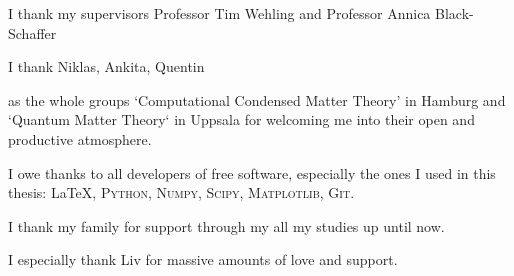 \documentclass[../main.tex]{subfiles}
\begin{document}
I thank my supervisors Professor Tim Wehling and Professor Annica Black-Schaffer

I thank Niklas, Ankita, Quentin

as the whole groups `Computational Condensed Matter Theory' in Hamburg and `Quantum Matter Theory` in Uppsala for welcoming me into their open and  productive atmosphere.

I owe thanks to all developers of free software, especially the ones I used in this thesis: \LaTeX, \textsc{Python}, \textsc{Numpy}, \textsc{Scipy}, \textsc{Matplotlib}, \textsc{Git}.

I thank my family for support through my all my studies up until now.

I especially thank Liv for massive amounts of love and support.
\end{document}
